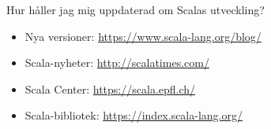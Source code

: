 \begin{Slide}{Hur håller jag mig uppdaterad om Scalas utveckling?}
\begin{itemize}%
  \item Nya versioner: \url{https://www.scala-lang.org/blog/}
  \item Scala-nyheter: \url{http://scalatimes.com/}
  \item Scala Center: \url{https://scala.epfl.ch/}
  \item Scala-bibliotek: \url{https://index.scala-lang.org/}
\end{itemize}
\end{Slide}




%
%


